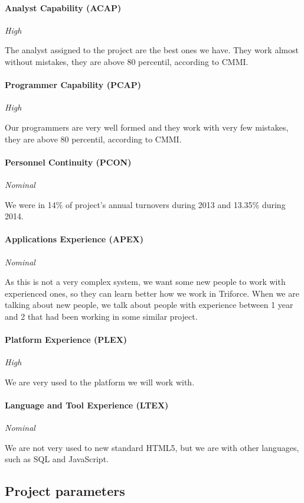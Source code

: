 \documentclass[11pt]{report}
\begin{document}
\paragraph{Analyst Capability (ACAP) } \textit{High}

The analyst assigned to the project are the best ones we have. They work almost without mistakes, they are above 80 percentil, according to CMMI.

\paragraph{Programmer Capability (PCAP) } \textit{High}

Our programmers are very well formed and they work with very few mistakes, they are above 80 percentil, according to CMMI.

\paragraph{Personnel Continuity (PCON) } \textit{Nominal}

We were in 14\% of project's annual turnovers during 2013 and 13.35\% during 2014.

\paragraph{Applications Experience (APEX) } \textit{Nominal}

As this is not a very complex system, we want some new people to work with experienced ones, so they can learn better how we work in Triforce. When we are talking about new people, we talk about people with experience between 1 year and 2 that had been working in some similar project. 


\paragraph{Platform Experience (PLEX) } \textit{High}

We are very used to the platform we will work with. 

\paragraph{Language and Tool Experience (LTEX) } \textit{Nominal}

We are not very used to new standard HTML5, but we are with other languages, such as SQL and JavaScript.


\subsection{Project parameters}
\end{document}
